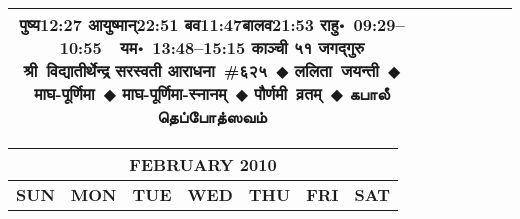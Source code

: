 \documentclass[a3paper,12pt,landscape]{article}
\newcommand{\eventsep}{~$\Diamondblack$ }
\newcommand{\To}{\hspace{1pt}\raisebox{0pt}{\tiny\RIGHTarrow}\hspace{1pt}}
\newcommand{\tamil}[1]{%
{\fontspec[Scale=0.9,FakeStretch=0.9]{Noto Sans Tamil} \footnotesize #1}}
\newcommand{\rahuyama}[2]{%
{राहु॰~\textsf{#1}~~यम॰~\textsf{#2}}
}
\begin{document}
\begin{center}
\begin{tabular}{|c|c|c|c|c|c|c|}
{{\mbox{पुष्य\To{}\textsf{12:27\hspace{2ex}}}}%
{\mbox{आयुष्मान्\To{}\textsf{22:51\hspace{2ex}}}}%
{\mbox{बव\To{}\textsf{11:47\hspace{2ex}}}\mbox{बालव\To{}\textsf{21:53\hspace{2ex}}}}}%
{\rahuyama{09:29--10:55}{13:48--15:15}}%
{काञ्ची ५१ जगद्गुरु श्री~विद्यातीर्थेन्द्र सरस्वती आराधना~\#{६२५}\eventsep ललिता~जयन्ती\eventsep माघ-पूर्णिमा\eventsep माघ-पूर्णिमा-स्नानम्\eventsep पौर्णमी~व्रतम्\eventsep \tamil{கபாலீ தெப்போத்ஸவம்}}
\\ \hline %
\end{tabular}



\begin{tabular}{|c|c|c|c|c|c|c|}
\multicolumn{7}{c}{\Large \bfseries \sffamily FEBRUARY 2010}\\[3mm]
\hline
\textbf{\textsf{SUN}} & \textbf{\textsf{MON}} & \textbf{\textsf{TUE}} & \textbf{\textsf{WED}} & \textbf{\textsf{THU}} & \textbf{\textsf{FRI}} & \textbf{\textsf{SAT}} \\ \hline


\end{tabular}
\end{center}
\end{document}
